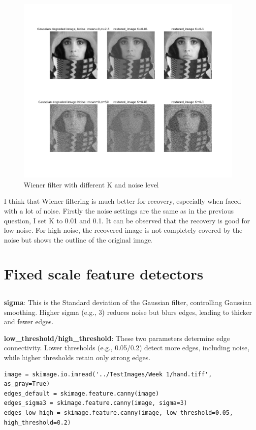 \documentclass[12pt]{article}
\begin{document}
\begin{figure}[h]
    \centering
    \includegraphics[width=1\textwidth]{pics/a5_2.3.png} 
    \caption{Wiener filter with different K and noise level}
\end{figure}
I think that Wiener filtering is much better for recovery, especially when faced with a lot of noise. Firstly the noise settings are the same as in the previous question, I set K to 0.01 and 0.1.
It can be observed that the recovery is good for low noise. For high noise, the recovered image is not completely covered by the noise but shows the outline of the original image.
\section{Fixed scale feature detectors}

\subsection{}

\textbf{sigma}: This is the Standard deviation of the Gaussian filter, controlling Gaussian smoothing. Higher sigma (e.g., 3) reduces noise but blurs edges, leading to thicker and fewer edges.

\textbf{low\_threshold/high\_threshold}: These two parameters determine edge connectivity. Lower thresholds (e.g., 0.05/0.2) detect more edges, including noise, while higher thresholds retain only strong edges.

\begin{lstlisting}
image = skimage.io.imread('../TestImages/Week 1/hand.tiff', as_gray=True)
edges_default = skimage.feature.canny(image)
edges_sigma3 = skimage.feature.canny(image, sigma=3)
edges_low_high = skimage.feature.canny(image, low_threshold=0.05, high_threshold=0.2)
\end{lstlisting}
\end{document}
